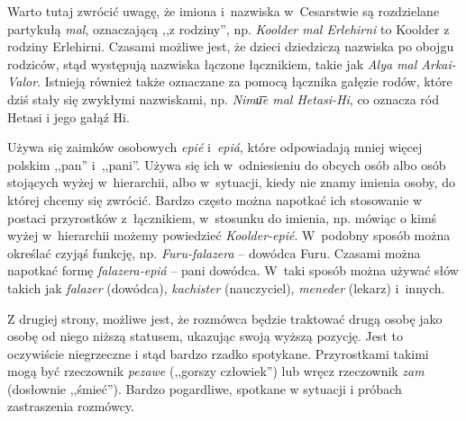 \begin{spacing}{1.1}
Warto tutaj zwrócić uwagę, że imiona i~nazwiska w~Cesarstwie są rozdzielane
partykułą \emph{mal}, oznaczającą ,,z rodziny'', np. \emph{Koolder mal
Erlehirni} to Koolder z rodziny Erlehirni. Czasami możliwe jest, że dzieci
dziedziczą nazwiska po obojgu rodziców, stąd występują nazwiska łączone
łącznikiem, takie jak \emph{Alya mal Arkai-Valor}. Istnieją również także
oznaczane za pomocą łącznika gałęzie rodów, które dziś stały się zwykłymi
nazwiskami, np. \emph{Nimu͞e mal Hetasi-Hi}, co oznacza ród Hetasi i jego gałąź
Hi.

\skipline

Używa się zaimków osobowych \emph{epié} i~\emph{epiá}, które odpowiadają mniej
więcej polskim ,,pan'' i~,,pani''. Używa się ich w~odniesieniu do obcych osób
albo osób stojących wyżej w~hierarchii, albo w~sytuacji, kiedy nie znamy imienia
osoby, do której chcemy się zwrócić. Bardzo często można napotkać ich stosowanie
w postaci przyrostków z~łącznikiem, w~stosunku do imienia, np. mówiąc o kimś
wyżej w~hierarchii możemy powiedzieć \emph{Koolder-epié}. W~podobny sposób
można określać czyjąś funkcję, np. \emph{Furu-falazera} -- dowódca Furu. Czasami
można napotkać formę \emph{falazera-epiá} -- pani dowódca. W~taki sposób można
używać słów takich jak \emph{falazer} (dowódca), \emph{kachister} (nauczyciel),
\emph{meneder} (lekarz) i~innych.


\skipline

Z drugiej strony, możliwe jest, że rozmówca będzie traktować drugą osobę jako
osobę od niego niższą statusem, ukazując swoją wyższą pozycję. Jest to
oczywiście niegrzeczne i stąd bardzo rzadko spotykane. Przyrostkami takimi mogą
być rzeczownik \emph{pezawe} (,,gorszy człowiek'') lub wręcz rzeczownik
\emph{zam} (dosłownie ,,śmieć''). Bardzo pogardliwe, spotkane w sytuacji i
próbach zastraszenia rozmówcy.


\end{spacing}
